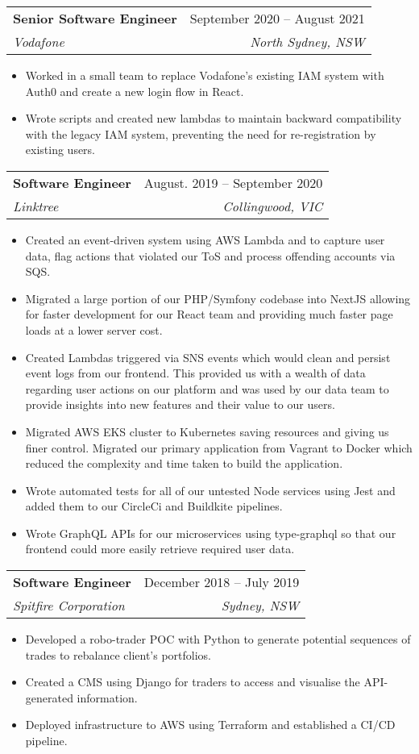 \documentclass[letterpaper,11pt]{article}
\makeatletter
\newcommand{\resumeItem}[1]{
  \item\normalsize{
    {#1 \vspace{1pt}}
  }
}
\newcommand{\resumeSubheading}[4]{
  \vspace{1pt}\item
    \begin{tabular*}{0.97\textwidth}[t]{l@{\extracolsep{\fill}}r}
      \textbf{#1} & #2 \\
      \textit{\small#3} & \textit{\small #4} \\
    \end{tabular*}\vspace{4pt}
}
\newcommand{\resumeSubSubheading}[2]{
    \item
    \begin{tabular*}{0.97\textwidth}{l@{\extracolsep{\fill}}r}
      \textit{\small#1} & \textit{\small #2} \\
    \end{tabular*}\vspace{4pt}
}
\newcommand{\resumeSubHeadingListEnd}{\end{itemize}}
\newcommand{\resumeItemListStart}{\begin{itemize}}
\newcommand{\resumeItemListEnd}{\end{itemize}\vspace{-5pt}}
\makeatother
\begin{document}
\resumeSubheading
{Senior Software Engineer}{September 2020 -- August 2021}
{Vodafone}{North Sydney, NSW}
\resumeItemListStart
\resumeItem{Worked in a small team to replace Vodafone's existing IAM system with Auth0 and create a new login flow in React.}
\resumeItem{Wrote scripts and created new lambdas to maintain backward compatibility with the legacy IAM system, preventing the need for re-registration by existing users.}

\resumeItemListEnd


\resumeSubheading
{Software Engineer}{August. 2019 -- September 2020}
{Linktree}{Collingwood, VIC}
\resumeItemListStart
\resumeItem{Created an event-driven system using AWS Lambda and to capture user data, flag actions that violated our ToS and process offending accounts via SQS.}
\resumeItem{Migrated a large portion of our PHP/Symfony codebase into NextJS allowing for faster development for our React team and providing much faster page loads at a lower server cost.}
\resumeItem{Created Lambdas triggered via SNS events which would clean and persist event logs from our frontend. This provided us with a wealth of data regarding user actions on our platform and was used by our data team to provide insights into new features and their value to our users.}
\resumeItem{Migrated AWS EKS cluster to Kubernetes saving resources and giving us finer control. Migrated our primary application from Vagrant to Docker which reduced the complexity and time taken to build the application.}
\resumeItem{Wrote automated tests for all of our untested Node services using Jest and added them to our CircleCi and Buildkite pipelines.}
\resumeItem{Wrote GraphQL APIs for our microservices using type-graphql so that our frontend could more easily retrieve required user data.}
\resumeItemListEnd

\resumeSubheading
{Software Engineer}{December 2018 -- July 2019}
{Spitfire Corporation}{Sydney, NSW}
\resumeItemListStart
\resumeItem{Developed a robo-trader POC with Python to generate potential sequences of trades to rebalance client's portfolios.}
\resumeItem{Created a CMS using Django for traders to access and visualise the API-generated information.}
\resumeItem{Deployed infrastructure to AWS using Terraform and established a CI/CD pipeline.}
\resumeItemListEnd
\end{document}

